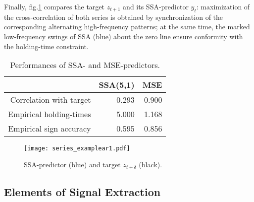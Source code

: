\documentclass[a4paper]{article}
\begin{document}
Finally, fig.\ref{series_examplear1} compares the target $z_{t+1}$ and its SSA-predictor $y_t$: maximization of the cross-correlation of both series is obtained by synchronization of the corresponding alternating high-frequency patterns; at the same time, the marked low-frequency swings of SSA (blue) about the zero line ensure conformity with the holding-time constraint. %
\begin{table}[ht]
\centering
\begin{tabular}{rrr}
  \hline
 & SSA(5,1) & MSE \\ 
  \hline
Correlation with target & 0.293 & 0.900 \\ 
  Empirical holding-times & 5.000 & 1.168 \\ 
  Empirical sign accuracy & 0.595 & 0.856 \\ 
   \hline
\end{tabular}
\caption{Performances of SSA- and MSE-predictors.  } 
\label{perf_ex2ar1}
\end{table}\begin{figure}[H]\begin{center}\texttt{[image: series\_examplear1.pdf]}\caption{SSA-predictor (blue) and target $z_{t+\delta}$ (black).\label{series_examplear1}}\end{center}\end{figure}







\subsection{Elements of Signal Extraction}\label{example_autocor}
\end{document}
